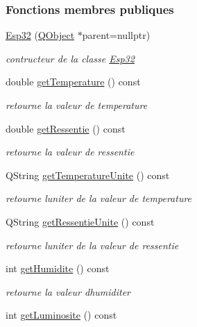 \subsubsection*{Fonctions membres publiques}
\begin{DoxyCompactItemize}
\item 
\hyperlink{class_esp32_abf9de8dee58d0105a551455874f29c19}{Esp32} (\hyperlink{class_q_object}{Q\+Object} $\ast$parent=nullptr)
\begin{DoxyCompactList}\small\item\em contructeur de la classe \hyperlink{class_esp32}{Esp32} \end{DoxyCompactList}\item 
double \hyperlink{class_esp32_adb339413686f3d78df1ecd41f106fd4e}{get\+Temperature} () const 
\begin{DoxyCompactList}\small\item\em retourne la valeur de temperature \end{DoxyCompactList}\item 
double \hyperlink{class_esp32_ae29854a5127d760a216f96ec7d797412}{get\+Ressentie} () const 
\begin{DoxyCompactList}\small\item\em retourne la valeur de ressentie \end{DoxyCompactList}\item 
Q\+String \hyperlink{class_esp32_ae20c976b79f87de083ca8ee49b2abf25}{get\+Temperature\+Unite} () const 
\begin{DoxyCompactList}\small\item\em retourne l\textquotesingle{}uniter de la valeur de temperature \end{DoxyCompactList}\item 
Q\+String \hyperlink{class_esp32_a548ed7533f742d087c65df256479ed00}{get\+Ressentie\+Unite} () const 
\begin{DoxyCompactList}\small\item\em retourne l\textquotesingle{}uniter de la valeur de ressentie \end{DoxyCompactList}\item 
int \hyperlink{class_esp32_a87f581ef8f01bcb71a7294cc545b242e}{get\+Humidite} () const 
\begin{DoxyCompactList}\small\item\em retourne la valeur d\textquotesingle{}humiditer \end{DoxyCompactList}\item 
int \hyperlink{class_esp32_aa2cdabace1ce70928c53d25e306a16d1}{get\+Luminosite} () const 

\end{DoxyCompactItemize}
